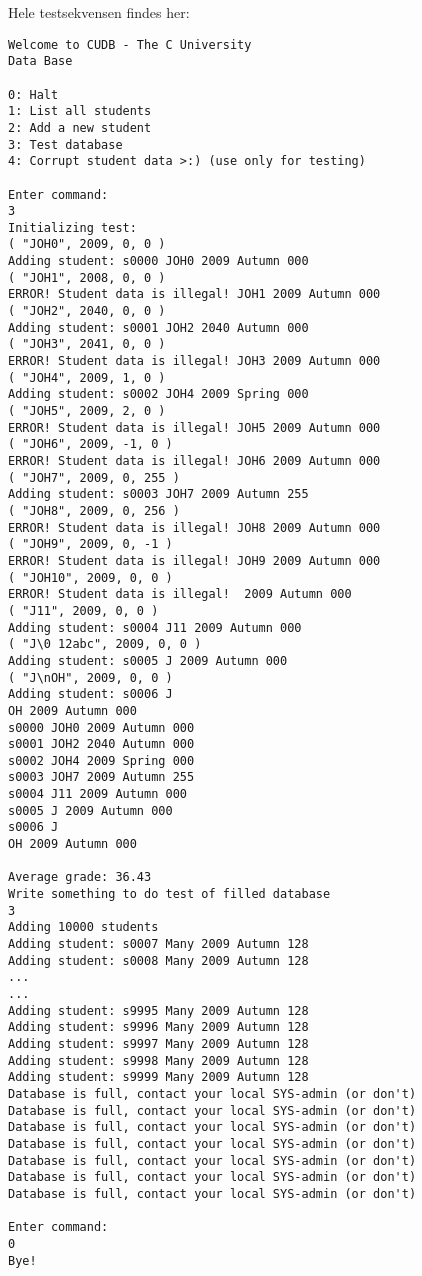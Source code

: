 Hele testsekvensen findes her:
\begin{lstlisting}[caption=Kald til testfunktionen\, der er klippet
ca. 10000 linjer ud\, da disse følger samme monster]
Welcome to CUDB - The C University
Data Base

0: Halt
1: List all students
2: Add a new student
3: Test database
4: Corrupt student data >:) (use only for testing)

Enter command: 
3
Initializing test:
( "JOH0", 2009, 0, 0 )
Adding student: s0000 JOH0 2009 Autumn 000
( "JOH1", 2008, 0, 0 )
ERROR! Student data is illegal! JOH1 2009 Autumn 000
( "JOH2", 2040, 0, 0 )
Adding student: s0001 JOH2 2040 Autumn 000
( "JOH3", 2041, 0, 0 )
ERROR! Student data is illegal! JOH3 2009 Autumn 000
( "JOH4", 2009, 1, 0 )
Adding student: s0002 JOH4 2009 Spring 000
( "JOH5", 2009, 2, 0 )
ERROR! Student data is illegal! JOH5 2009 Autumn 000
( "JOH6", 2009, -1, 0 )
ERROR! Student data is illegal! JOH6 2009 Autumn 000
( "JOH7", 2009, 0, 255 )
Adding student: s0003 JOH7 2009 Autumn 255
( "JOH8", 2009, 0, 256 )
ERROR! Student data is illegal! JOH8 2009 Autumn 000
( "JOH9", 2009, 0, -1 )
ERROR! Student data is illegal! JOH9 2009 Autumn 000
( "JOH10", 2009, 0, 0 )
ERROR! Student data is illegal!  2009 Autumn 000
( "J11", 2009, 0, 0 )
Adding student: s0004 J11 2009 Autumn 000
( "J\0 12abc", 2009, 0, 0 )
Adding student: s0005 J 2009 Autumn 000
( "J\nOH", 2009, 0, 0 )
Adding student: s0006 J
OH 2009 Autumn 000
s0000 JOH0 2009 Autumn 000
s0001 JOH2 2040 Autumn 000
s0002 JOH4 2009 Spring 000
s0003 JOH7 2009 Autumn 255
s0004 J11 2009 Autumn 000
s0005 J 2009 Autumn 000
s0006 J
OH 2009 Autumn 000

Average grade: 36.43
Write something to do test of filled database
3
Adding 10000 students
Adding student: s0007 Many 2009 Autumn 128
Adding student: s0008 Many 2009 Autumn 128
...
...
Adding student: s9995 Many 2009 Autumn 128
Adding student: s9996 Many 2009 Autumn 128
Adding student: s9997 Many 2009 Autumn 128
Adding student: s9998 Many 2009 Autumn 128
Adding student: s9999 Many 2009 Autumn 128
Database is full, contact your local SYS-admin (or don't)
Database is full, contact your local SYS-admin (or don't)
Database is full, contact your local SYS-admin (or don't)
Database is full, contact your local SYS-admin (or don't)
Database is full, contact your local SYS-admin (or don't)
Database is full, contact your local SYS-admin (or don't)
Database is full, contact your local SYS-admin (or don't)

Enter command:
0
Bye!
\end{lstlisting}

